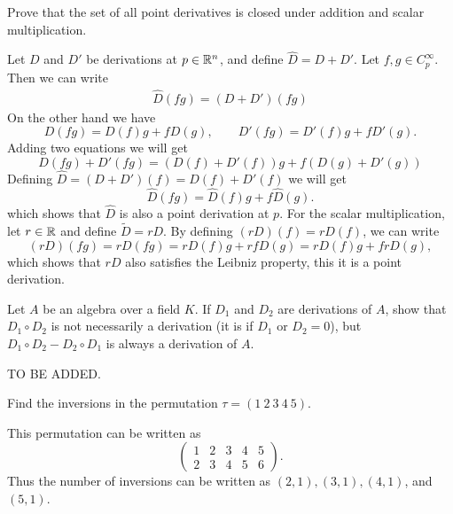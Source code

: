\begin{problem}
	Prove that the set of all point derivatives is closed under addition and scalar multiplication.
\end{problem}
\begin{solution}
	Let $ D $ and $ D' $ be derivations at $ p\in\mathbb{R}^n $, and define $ \hat{D} = D + D' $. Let $ f,g \in C_p^\infty $. Then we can write
	\begin{align*}
		\hat{D} (fg) = (D + D')(fg)
	\end{align*}
	On the other hand we have
	\[ D(fg) = D(f)g + fD(g), \qquad D'(fg) = D'(f)g + fD'(g). \]
	Adding two equations we will get
	\[ D(fg) + D'(fg) = (D(f) + D'(f))g + f(D(g)+D'(g)) \]
	Defining $ \hat{D} = (D+D')(f) = D(f)+D'(f) $ we will get
	\[ \hat{D}(fg) = \hat{D}(f) g + f \hat{D}(g).  \]
	which shows that $ \hat{D} $ is also a point derivation at $ p $.
	For the scalar multiplication, let $ r \in \mathbb{R} $ and define $ \tilde{D} = rD $. By defining $ (rD)(f) = rD(f) $, we can write
	\[ (rD)(fg) = rD(fg) = rD(f)g + rfD(g) = rD(f)g + frD(g),  \]
	which shows that $ rD $ also satisfies the Leibniz property, this it is a point derivation.
\end{solution}

\begin{problem}
	Let $ A $ be an algebra over a field $ K $. If $ D_1 $ and $ D_2 $ are derivations of $ A $, show that $ D_1\circ D_2 $ is not necessarily a derivation (it is if $ D_1 $ or $ D_2 = 0 $), but $ D_1\circ D_2 - D_2 \circ D_1 $ is always a derivation of $ A $.	
\end{problem}
\begin{solution}
	{\color{orange} TO BE ADDED. }
\end{solution}



\begin{problem}
	Find the inversions in the permutation $ \tau = (1\ 2\ 3\ 4\ 5) $.
\end{problem}
\begin{solution}
	This permutation can be written as
	\[ \begin{pmatrix}
		1 & 2 & 3 & 4 & 5 \\
		2 & 3 & 4 & 5 & 6
	\end{pmatrix}. \]
	Thus the number of inversions can be written as $ (2,1),(3,1),(4,1)$, and $ (5,1) $.
\end{solution}

